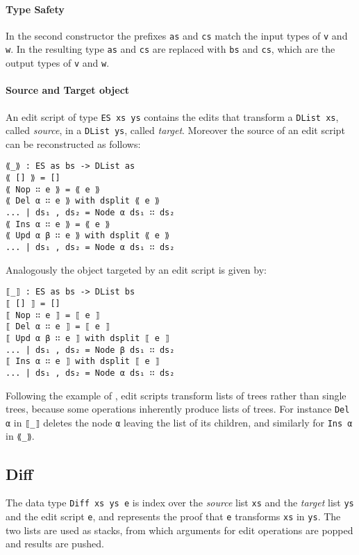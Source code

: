 \documentclass[../Thesis.tex]{subfiles}
\begin{document}
	\paragraph{Type Safety}
	In the second constructor the prefixes \texttt{as} and \texttt{cs} match
	the input types of \texttt{v} and \texttt{w}.
	In the resulting type \texttt{as} and \texttt{cs} are replaced with
	\texttt{bs} and \texttt{cs}, which are the output types of 
	\texttt{v} and \texttt{w}.
	
	\paragraph{Source and Target object}
	\label{par:SourceTargetObj}
	An edit script of type \texttt{ES xs ys} contains the edits
	that transform a \texttt{DList xs}, called \emph{source}, 
	in a \texttt{DList ys}, called \emph{target}. 
	Moreover the source of an edit script can be reconstructed as follows:
		
\begin{verbatim}
⟪_⟫ : ES as bs -> DList as
⟪ [] ⟫ = []
⟪ Nop ∷ e ⟫ = ⟪ e ⟫
⟪ Del α ∷ e ⟫ with dsplit ⟪ e ⟫
... | ds₁ , ds₂ = Node α ds₁ ∷ ds₂
⟪ Ins α ∷ e ⟫ = ⟪ e ⟫
⟪ Upd α β ∷ e ⟫ with dsplit ⟪ e ⟫
... | ds₁ , ds₂ = Node α ds₁ ∷ ds₂
\end{verbatim}

Analogously the object targeted by an edit script is given by:

\begin{verbatim}
⟦_⟧ : ES as bs -> DList bs
⟦ [] ⟧ = []
⟦ Nop ∷ e ⟧ = ⟦ e ⟧
⟦ Del α ∷ e ⟧ = ⟦ e ⟧
⟦ Upd α β ∷ e ⟧ with dsplit ⟦ e ⟧
... | ds₁ , ds₂ = Node β ds₁ ∷ ds₂
⟦ Ins α ∷ e ⟧ with dsplit ⟦ e ⟧
... | ds₁ , ds₂ = Node α ds₁ ∷ ds₂
\end{verbatim}

Following the example of \cite{Lemp09}, edit scripts transform lists of trees rather than single trees, because some operations inherently produce lists of trees.
For instance \texttt{Del α} in \texttt{⟦\_⟧} deletes the node \texttt{α} 
leaving the list of its children, and similarly for \texttt{Ins α} in \texttt{⟪\_⟫}.

	\subsection{Diff}	
	\label{subsec:Diff}
	The data type \texttt{Diff xs ys e} is index over the \emph{source}  list 
	\texttt{xs} and the \emph{target} list \texttt{ys} and the edit script 
	\texttt{e},  and represents the proof that \texttt{e} transforms \texttt{xs} 	in \texttt{ys}.
	The two lists are used as stacks, from which arguments for 
	edit operations are popped and results are pushed.
\end{document}

